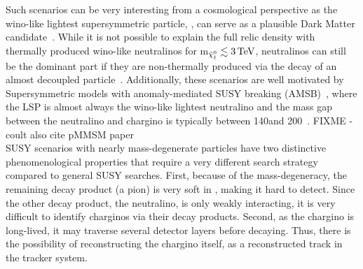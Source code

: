 Such scenarios can be very interesting from a cosmological perspective as the wino-like lightest supersymmetric particle, \chiO, can serve as a plausible Dark Matter candidate~\cite{bib:Ibe:DarkMatter_2015,bib:Hisano:DarkMatter_2005}.
While it is not possible to explain the full relic density with thermally produced wino-like neutralinos for m$_{\tilde{\chi}^{0}_{1}}\lesssim 3\,\text{Te}\kern-0.06667em\text{V}$, neutralinos can still be the dominant part if they are non-thermally produced via the decay of an almost decoupled particle~\cite{bib:Moroi:DarkMatter_1999,bib:Moroi:DarkMatter_2013}.
Additionally, these scenarios are well motivated by Supersymmetric models with anomaly-mediated SUSY breaking (AMSB)~\cite{bib:Theory_AMSB_1998,bib:Theory_AMSB_1999}, where the LSP is almost always the wino-like lightest neutralino and the mass gap between the neutralino and chargino is typically between 140\mev and 200\mev~\cite{bib:Theory_MassGap_2014}. FIXME - coult also cite pMMSM paper\\

SUSY scenarios with nearly mass-degenerate particles have two distinctive phenomenological properties that require a very different search strategy compared to general SUSY searches. 
First, because of the mass-degeneracy, the remaining decay product (\eg a pion) is very soft in \pt, making it hard to detect.
Since the other decay product, the neutralino, is only weakly interacting, it is very difficult to identify charginos via their decay products. 
Second, as the chargino is long-lived, it may traverse several detector layers before decaying.
Thus, there is the possibility of reconstructing the chargino itself, \eg as a reconstructed track in the tracker system.
 \\

